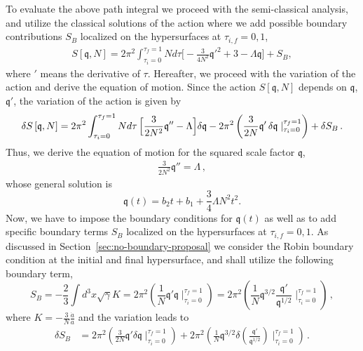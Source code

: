 \documentclass[superscriptaddress,aps,preprintnumbers,nofootinbib]{revtex4-2}
\begin{document}
To evaluate the above path integral we proceed with the semi-classical analysis, and utilize the classical solutions of the action where we add possible boundary contributions $S_B$ localized on the hypersurfaces at $\tau_{i,f}=0,1$,
\begin{align}
S\left[\mathfrak{q},N\right]
=2\pi^2 \int_{\tau_i=0}^{\tau_f=1} Nd\tau 
 \Biggl[-\frac{3}{4N^2}{\mathfrak{q}'}^2
 +3-\Lambda \mathfrak{q}\Biggr]+S_B ,
\end{align}
where $'$ means the derivative of $\tau$.
Hereafter, we proceed with the variation of the action and derive the equation of motion. Since the action $S\left[\mathfrak{q},N\right]$ depends on $\mathfrak{q}$, ${\mathfrak{q}'}$, the variation of the action is given by 
\begin{align}
\begin{split}
\delta S\left[\mathfrak{q},N\right] = 2\pi^2 \int_{\tau_i=0}^{\tau_f=1} Nd\tau \, \Bigl[\frac{3}{2N^2}{\mathfrak{q}''}-\Lambda\Bigr] \delta \mathfrak{q} - 2\pi^2
\left(\frac{3}{2N}{\mathfrak{q}'}\, \delta \mathfrak{q}\mid^{\tau_f=1}_{\tau_i=0} \right)
+ \delta S_B\,.   
\end{split}
\end{align}
Thus, we derive the equation of motion for the squared scale factor $\mathfrak{q}$, 
\begin{align}
\frac{3}{2N^2}{\mathfrak{q}''}=\Lambda\,, \label{eq:gr-eom}
\end{align} 
whose general solution is 
\begin{equation}\label{eq:gr-solution}
\mathfrak{q}(t)=b_2 t+b_1+\frac{3}{4} \Lambda  N^2 t^2.    
\end{equation}
Now, we have to impose the boundary conditions for $\mathfrak{q}(t)$ as well as to add specific boundary terms $S_B$ localized on the hypersurfaces at $\tau_{i,f}=0,1$. As discussed in Section~\ref{sec:no-boundary-proposal} we consider the Robin boundary condition at the initial and final hypersurface, and shall utilize the following boundary term, 
\begin{equation}
S_B=-\frac{2}{3}\int d^3x \sqrt{\gamma}K=
2\pi^2
\left(\frac{1}{N}{\mathfrak{q}'} \mathfrak{q}\mid^{\tau_f=1}_{\tau_i=0} \right)= 2\pi^2
\left(\frac{1}{N} \mathfrak{q}^{3/2}\frac{{\mathfrak{q}'}}{\mathfrak{q}^{1/2}}\mid^{\tau_f=1}_{\tau_i=0} \right)\,, 
\end{equation}
where $K=-\frac{3}{N}\frac{\dot{a}}{a}$ and 
the variation leads to 
\begin{align}
\delta S_B&=2\pi^2
\left(\frac{3}{2N}{\mathfrak{q}'}\delta \mathfrak{q}\mid^{\tau_f=1}_{\tau_i=0} \right) 
+ 2\pi^2
\left(\frac{1}{N} \mathfrak{q}^{3/2} \delta
\left(\frac{{\mathfrak{q}'}}{\mathfrak{q}^{1/2}}\right)
\mid^{\tau_f=1}_{\tau_i=0} \right)\,.
\end{align}
\end{document}
